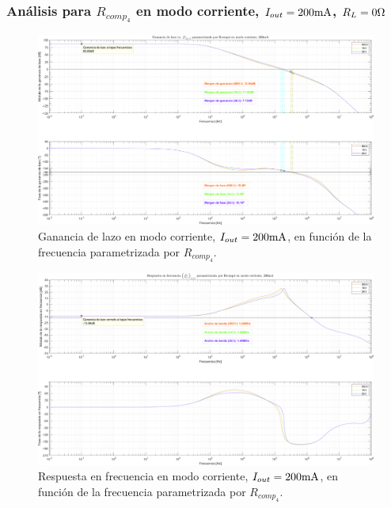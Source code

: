 \subsubsection{Análisis para $R_{comp_{4}}$ en modo corriente, $I_{out} = 200 \si[per-mode=symbol]{\milli\ampere}$, $R_{L} = 0 \si[per-mode=symbol]{\ohm}$}

\clearpage

\begin{figure}[H] %
\begin{center}
\includegraphics[width=1.1 \textwidth, angle=90]{./img/plots/loop/power_supply_RCOMP4_LOOP_Modo4.png}
\caption{\label{fig:fig_power_supply_RCOMP4_LOOP_Modo4}\footnotesize{Ganancia de lazo en modo corriente, $I_{out} = 200 \si[per-mode=symbol]{\milli\ampere}$, en función de la frecuencia parametrizada por $R_{comp_{4}}$.}}
\end{center}
\end{figure}


\clearpage

\begin{figure}[H] %
\begin{center}
\includegraphics[width=1.1 \textwidth, angle=90]{./img/plots/rf/power_supply_RCOMP4_RF_Modo4.png}
\caption{\label{fig:fig_power_supply_RCOMP4_RF_Modo4}\footnotesize{Respuesta en frecuencia en modo corriente, $I_{out} = 200 \si[per-mode=symbol]{\milli\ampere}$, en función de la frecuencia parametrizada por $R_{comp_{4}}$.}}
\end{center}
\end{figure}

